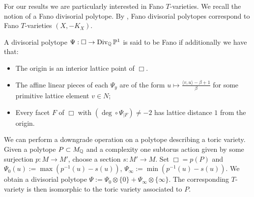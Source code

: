 For our results we are particularly interested in Fano \(T\)-varieties. We recall the notion of a Fano divisorial polytope. By \cite{}, Fano divisorial polytopes correspond to Fano \(T\)-varieties \((X,-K_X)\).
\begin{definition}
A divisorial polytope \(\Psi: \Box \to \operatorname{Div}_{\mathbb{Q}} \mathbb{P}^1\) is said to be Fano if additionally we have that:
\begin{itemize}
\item The origin is an interior lattice point of \(\Box\).
\item The affine linear pieces of each  \(\Psi_y\) are of the form \(u \mapsto \frac{\langle v,u \rangle - \beta + 1}{\beta}\) for some primitive lattice element \(v \in N\);
\item Every facet \(F\) of \(\Box\) with \((\deg \circ \Psi _{|F}) \neq -2\) has lattice distance \(1\) from the origin.
\end{itemize}
\end{definition}
\begin{example} \label{ex:polytopedowngrade}
We can perform a downgrade operation on a polytope describing a toric variety. Given a polytope \(P \subset M_{\mathbb{Q}}\) and a complexity one subtorus action given by some surjection \(p:M \to M'\), choose a section \(s: M' \to M\). Set \(\Box = p(P)\) and \(\Psi_0(u) := \max( p^{-1}(u) - s(u))\), \(\Psi_\infty := \min(p^{-1}(u) - s(u))\). We obtain a divisorial polytope \(\Psi := \Psi_0 \otimes \{0\} + \Psi_\infty \otimes \{\infty\}\). The corresponding \(T\)-variety is then isomorphic to the toric variety associated to \(P\).
\end{example}
